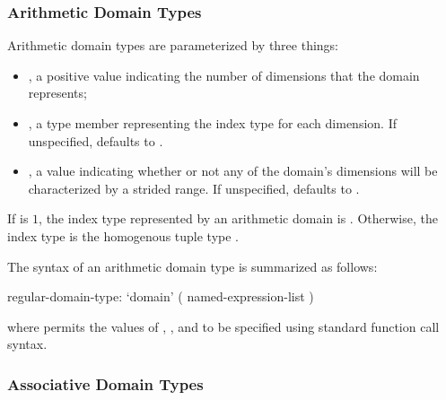 \subsubsection{Arithmetic Domain Types}

Arithmetic domain types are parameterized by three things:
\begin{itemize}

 \item {}, a positive  value indicating the number
of dimensions that the domain represents;

 \item {}, a type member representing the index type for
each dimension.  If unspecified,  defaults
to .


 \item {}, a  value indicating whether or not
any of the domain's dimensions will be characterized by a strided
range.  If unspecified,  defaults to .

\end{itemize}

If  is $1$, the index type represented by an arithmetic
domain is .  Otherwise, the index type is the homogenous
tuple type .


The syntax of an arithmetic domain type is summarized as follows:

\begin{syntax}
regular-domain-type:
  `domain' ( named-expression-list )
\end{syntax}

\noindent where  permits the values of
, , and  to be specified
using standard function call syntax.

%
%


\subsubsection{Associative Domain Types}
\label{Associative_Domain_Types}

